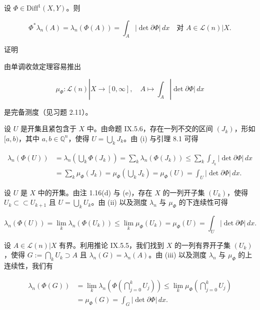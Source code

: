 \begin{proposition}

设 $ \Phi \in \mathrm{Diff}^{1}(X, Y) $。则

\[
\Phi^{*}\lambda_{n}(A) = \lambda_{n}(\Phi(A)) = \int_{A} |\det \partial\Phi| \, dx \quad \text{对 } A \in \mathcal{L}(n)|X .
\]

证明

\begin{subitems}
\item

由单调收敛定理容易推出

\[
\mu_{\Phi} : \mathcal{L}(n)|X \to [0, \infty] , \quad A \mapsto \int_{A} |\det \partial\Phi| \, dx
\]

是完备测度（见习题 2.11）。

\item

设 $ U $ 是开集且紧包含于 $ X $ 中。由命题 IX.5.6，存在一列不交的区间 $ (J_{k}) $，形如 $ [a, b) $，其中 $ a, b \in \mathbb{Q}^{n} $，使得 $ U = \bigcup_{k} J_{k} $。由 (i) 与引理 8.1 可得

\begin{equation*}
\begin{aligned}
\lambda_{n}(\Phi(U)) &= \lambda_{n}\left(\bigcup_{k} \Phi(J_{k})\right) = \sum_{k} \lambda_{n}(\Phi(J_{k})) \le \sum_{k} \int_{J_{k}} |\det \partial\Phi| \, dx \\ &= \sum_{k} \mu_{\Phi}(J_{k}) = \mu_{\Phi}\left(\bigcup_{k} J_{k}\right) = \mu_{\Phi}(U) = \int_{U} |\det \partial\Phi| \, dx .
\end{aligned}
\end{equation*}
\item

设 $ U $ 是 $ X $ 中的开集。由注 1.16(d) 与 (e)，存在 $ X $ 的一列开子集 $ (U_{k}) $，使得 $ U_{k} \subset\subset U_{k+1} $ 且 $ U = \bigcup_{k} U_{k} $。由 (ii) 以及测度 $ \lambda_{n} $ 与 $ \mu_{\Phi} $ 的下连续性可得

\[
\lambda_{n}(\Phi(U)) = \lim_{k} \lambda_{n}(\Phi(U_{k})) \le \lim_{k} \mu_{\Phi}(U_{k}) = \mu_{\Phi}(U) = \int_{U} |\det \partial\Phi| \, dx .
\]
\item

设 $ A \in \mathcal{L}(n)|X $ 有界。利用推论 IX.5.5，我们找到 $ X $ 的一列有界开子集 $ (U_{k}) $，使得 $ G := \bigcap_{k} U_{k} \supset A $ 且 $ \lambda_{n}(G) = \lambda_{n}(A) $。由 (iii) 以及测度 $ \lambda_{n} $ 与 $ \mu_{\Phi} $ 的上连续性，我们有

\begin{equation*}
\begin{aligned}
\lambda_{n}(\Phi(G)) &= \lim_{k} \lambda_{n}\left(\Phi\left(\bigcap_{j=0}^{k} U_{j}\right)\right) \le \lim_{k} \mu_{\Phi}\left(\bigcap_{j=0}^{k} U_{j}\right) \\ &= \mu_{\Phi}(G) = \int_{G} |\det \partial\Phi| \, dx .
\end{aligned}
\end{equation*}


\end{subitems}
\end{proposition}
